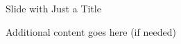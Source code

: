 \begin{SlideTitleOnly}{Slide with Just a Title}
    \begin{center}
        \Large Additional content goes here (if needed)
    \end{center}
\end{SlideTitleOnly}
